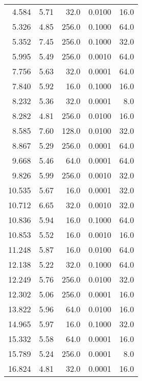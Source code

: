 \begin{table}[htpb]
\begin{adjustbox}{totalheight=\baselineskip}
\begin{tabular}{rrrrr}
    4.584 &   5.71 &        32.0 &         0.0100 &         16.0 \\
    5.326 &   4.85 &       256.0 &         0.1000 &         64.0 \\
    5.352 &   7.45 &       256.0 &         0.1000 &         32.0 \\
    5.995 &   5.49 &       256.0 &         0.0010 &         64.0 \\
    7.756 &   5.63 &        32.0 &         0.0001 &         64.0 \\
    7.840 &   5.92 &        16.0 &         0.1000 &         16.0 \\
    8.232 &   5.36 &        32.0 &         0.0001 &          8.0 \\
    8.282 &   4.81 &       256.0 &         0.0100 &         16.0 \\
    8.585 &   7.60 &       128.0 &         0.0100 &         32.0 \\
    8.867 &   5.29 &       256.0 &         0.0001 &         64.0 \\
    9.668 &   5.46 &        64.0 &         0.0001 &         64.0 \\
    9.826 &   5.99 &       256.0 &         0.0010 &         32.0 \\
   10.535 &   5.67 &        16.0 &         0.0001 &         32.0 \\
   10.712 &   6.65 &        32.0 &         0.0010 &         32.0 \\
   10.836 &   5.94 &        16.0 &         0.1000 &         64.0 \\
   10.853 &   5.52 &        16.0 &         0.0010 &         16.0 \\
   11.248 &   5.87 &        16.0 &         0.0100 &         64.0 \\
   12.138 &   5.22 &        32.0 &         0.1000 &         64.0 \\
   12.249 &   5.76 &       256.0 &         0.0100 &         32.0 \\
   12.302 &   5.06 &       256.0 &         0.0001 &         16.0 \\
   13.822 &   5.96 &        64.0 &         0.0100 &         16.0 \\
   14.965 &   5.97 &        16.0 &         0.1000 &         32.0 \\
   15.332 &   5.58 &        64.0 &         0.0001 &         16.0 \\
   15.789 &   5.24 &       256.0 &         0.0001 &          8.0 \\
   16.824 &   4.81 &        32.0 &         0.0001 &         16.0 \\

\end{tabular}
\end{adjustbox}
\end{table}
